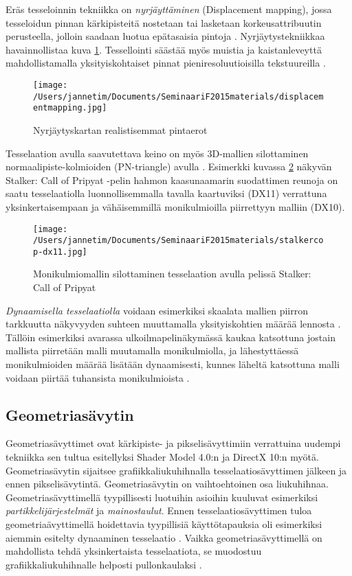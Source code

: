 \documentclass[finnish]{tktltiki2}
\theoremstyle{definition}
\theoremstyle{remark}
\begin{document}
Eräs tesseloinnin tekniikka on \emph{nyrjäyttäminen} (Displacement mapping), jossa tesseloidun pinnan kärkipisteitä nostetaan tai lasketaan korkeusattribuutin perusteella, jolloin saadaan luotua epätasaisia pintoja \cite{Nvi10}. Nyrjäytystekniikkaa havainnollistaa kuva \ref{displacement}. Tessellointi säästää myös muistia ja kaistanleveyttä mahdollistamalla yksityiskohtaiset pinnat pieniresoluutioisilla tekstuureilla \cite{Mic11} \cite{Nvi10}.

\begin{figure}[t]
\texttt{[image: /Users/jannetim/Documents/SeminaariF2015materials/displacementmapping.jpg]}
\caption{Nyrjäytyskartan realistisemmat pintaerot}
\label{displacement}
\end{figure}

Tesselaation avulla saavutettava keino on myös 3D-mallien silottaminen normaalipiste-kolmioiden (PN-triangle) avulla \cite{Vla01}. Esimerkki kuvassa \ref{SCoP} näkyvän Stalker: Call of Pripyat -pelin hahmon kaasunaamarin suodattimen reunoja on saatu tesselaatiolla luonnollisemmalla tavalla kaartuviksi (DX11) verrattuna yksinkertaisempaan ja vähäisemmillä monikulmioilla piirrettyyn malliin (DX10). 

\begin{figure}[!hbpt]
\texttt{[image: /Users/jannetim/Documents/SeminaariF2015materials/stalkercop-dx11.jpg]}
\caption{Monikulmiomallin silottaminen tesselaation avulla pelissä Stalker: Call of Pripyat}
\label{SCoP}
\end{figure}

\emph{Dynaamisella tesselaatiolla} voidaan esimerkiksi skaalata mallien piirron tarkkuutta näkyvyyden suhteen muuttamalla yksityiskohtien määrää lennosta \cite{Nvi10}. Tällöin esimerkiksi avarassa ulkoilmapelinäkymässä kaukaa katsottuna jostain mallista piirretään malli muutamalla monikulmiolla, ja lähestyttäessä monikulmioiden määrää lisätään dynaamisesti, kunnes läheltä katsottuna malli voidaan piirtää tuhansista monikulmioista \cite{Gre14}.

\subsection{Geometriasävytin}

Geometriasävyttimet ovat kärkipiste- ja pikselisävyttimiin verrattuina uudempi tekniikka sen tultua esitellyksi Shader Model 4.0:n ja DirectX 10:n myötä. Geometriasävytin sijaitsee grafiikkaliukuhihnalla tesselaatiosävyttimen jälkeen ja ennen pikselisävytintä. Geometriasävytin on vaihtoehtoinen osa liukuhihnaa. Geometriasävyttimellä tyypillisesti luotuihin asioihin kuuluvat esimerkiksi \emph{partikkelijärjestelmät} ja \emph{mainostaulut}. Ennen tesselaatiosävyttimen tuloa geometriaävyttimellä hoidettavia tyypillisiä käyttötapauksia oli esimerkiksi aiemmin esitelty dynaaminen tesselaatio \cite{Mic11}. Vaikka geometriasävyttimellä on mahdollista tehdä yksinkertaista tesselaatiota, se muodostuu grafiikkaliukuhihnalle helposti pullonkaulaksi \cite{Sch14}. 
\end{document}
